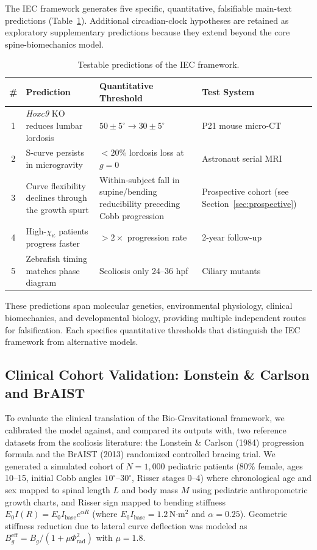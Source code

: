 The IEC framework generates five specific, quantitative, falsifiable main-text predictions (Table~\ref{tab:predictions}). Additional circadian-clock hypotheses are retained as exploratory supplementary predictions because they extend beyond the core spine-biomechanics model.

\begin{table}[h!]
\centering
\caption{Testable predictions of the IEC framework.}
\label{tab:predictions}
\small
\begin{tabular}{clll}
\toprule
\textbf{\#} & \textbf{Prediction} & \textbf{Quantitative Threshold} & \textbf{Test System} \\
\midrule
1 & \textit{Hoxc9} KO reduces lumbar lordosis & $50 \pm 5^\circ \to 30 \pm 5^\circ$ & P21 mouse micro-CT \\
2 & S-curve persists in microgravity & $<20\%$ lordosis loss at $g = 0$ & Astronaut serial MRI \\
3 & Curve flexibility declines through the growth spurt & Within-subject fall in supine/bending reducibility preceding Cobb progression & Prospective cohort (see Section~\ref{sec:prospective}) \\
4 & High-$\chi_\kappa$ patients progress faster & $>2\times$ progression rate & 2-year follow-up \\
5 & Zebrafish timing matches phase diagram & Scoliosis only 24--36 hpf & Ciliary mutants \\
\bottomrule
\end{tabular}
\end{table}

These predictions span molecular genetics, environmental physiology, clinical biomechanics, and developmental biology, providing multiple independent routes for falsification. Each specifies quantitative thresholds that distinguish the IEC framework from alternative models.

\subsection{Clinical Cohort Validation: Lonstein \& Carlson and BrAIST}

To evaluate the clinical translation of the Bio-Gravitational framework, we calibrated the model against, and compared its outputs with, two reference datasets from the scoliosis literature: the Lonstein \& Carlson (1984) progression formula and the BrAIST (2013) randomized controlled bracing trial. We generated a simulated cohort of $N=1,000$ pediatric patients (80\% female, ages 10--15, initial Cobb angles $10^\circ$--$30^\circ$, Risser stages 0--4) where chronological age and sex mapped to spinal length $L$ and body mass $M$ using pediatric anthropometric growth charts, and Risser sign mapped to bending stiffness $E_0 I(R) = E_0 I_{\mathrm{base}} e^{\alpha R}$ (where $E_0 I_{\mathrm{base}} = 1.2$\,N$\cdot$m$^2$ and $\alpha = 0.25$). Geometric stiffness reduction due to lateral curve deflection was modeled as $B_g^{\mathrm{eff}} = B_g / (1 + \mu \Phi_{\mathrm{rad}}^2)$ with $\mu = 1.8$.

